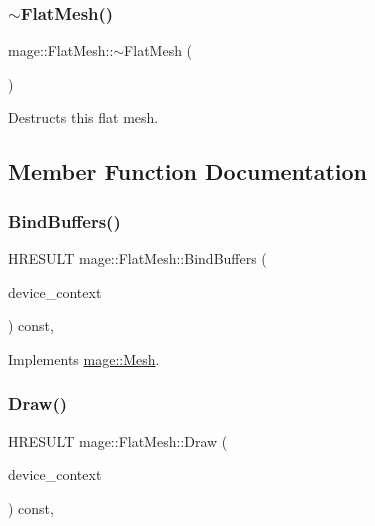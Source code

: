 \subsubsection{\texorpdfstring{$\sim$\+Flat\+Mesh()}{~FlatMesh()}}
{\footnotesize\ttfamily mage\+::\+Flat\+Mesh\+::$\sim$\+Flat\+Mesh (\begin{DoxyParamCaption}{ }\end{DoxyParamCaption})\hspace{0.3cm}{\ttfamily [virtual]}}

Destructs this flat mesh. 

\subsection{Member Function Documentation}
\hypertarget{classmage_1_1_flat_mesh_ab1906ae929a514a7b9b348d6a97fc2d4}{}\label{classmage_1_1_flat_mesh_ab1906ae929a514a7b9b348d6a97fc2d4} 
\subsubsection{\texorpdfstring{Bind\+Buffers()}{BindBuffers()}}
{\footnotesize\ttfamily H\+R\+E\+S\+U\+LT mage\+::\+Flat\+Mesh\+::\+Bind\+Buffers (\begin{DoxyParamCaption}\item[{I\+D3\+D11\+Device\+Context2 $\ast$}]{device\+\_\+context }\end{DoxyParamCaption}) const\hspace{0.3cm}{\ttfamily [override]}, {\ttfamily [virtual]}}



Implements \hyperlink{classmage_1_1_mesh_adb7cecd184c021c6184b6444adeb5190}{mage\+::\+Mesh}.

\hypertarget{classmage_1_1_flat_mesh_abf73ceb1c98d4bd6925be6e6e087723b}{}\label{classmage_1_1_flat_mesh_abf73ceb1c98d4bd6925be6e6e087723b} 
\subsubsection{\texorpdfstring{Draw()}{Draw()}}
{\footnotesize\ttfamily H\+R\+E\+S\+U\+LT mage\+::\+Flat\+Mesh\+::\+Draw (\begin{DoxyParamCaption}\item[{I\+D3\+D11\+Device\+Context2 $\ast$}]{device\+\_\+context }\end{DoxyParamCaption}) const\hspace{0.3cm}{\ttfamily [override]}, {\ttfamily [virtual]}}



